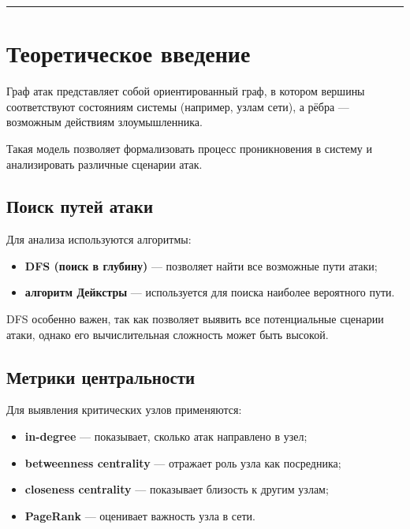 \documentclass[
  english,
  russian,
  12pt,
  a4paper,
  DIV=11,
  numbers=noendperiod]{scrreprt}
\providecommand{\tightlist}{%
  \setlength{\itemsep}{0pt}\setlength{\parskip}{0pt}}
\begin{document}
\begin{center}\rule{0.5\linewidth}{0.5pt}\end{center}

\chapter{Теоретическое
введение}\label{ux442ux435ux43eux440ux435ux442ux438ux447ux435ux441ux43aux43eux435-ux432ux432ux435ux434ux435ux43dux438ux435}

Граф атак представляет собой ориентированный граф, в котором вершины
соответствуют состояниям системы (например, узлам сети), а рёбра ---
возможным действиям злоумышленника.

Такая модель позволяет формализовать процесс проникновения в систему и
анализировать различные сценарии атак.

\section{Поиск путей
атаки}\label{ux43fux43eux438ux441ux43a-ux43fux443ux442ux435ux439-ux430ux442ux430ux43aux438}

Для анализа используются алгоритмы:

\begin{itemize}
\tightlist
\item
  \textbf{DFS (поиск в глубину)} --- позволяет найти все возможные пути
  атаки;
\item
  \textbf{алгоритм Дейкстры} --- используется для поиска наиболее
  вероятного пути.
\end{itemize}

DFS особенно важен, так как позволяет выявить все потенциальные сценарии
атаки, однако его вычислительная сложность может быть высокой.

\section{Метрики
центральности}\label{ux43cux435ux442ux440ux438ux43aux438-ux446ux435ux43dux442ux440ux430ux43bux44cux43dux43eux441ux442ux438}

Для выявления критических узлов применяются:

\begin{itemize}
\tightlist
\item
  \textbf{in-degree} --- показывает, сколько атак направлено в узел;
\item
  \textbf{betweenness centrality} --- отражает роль узла как посредника;
\item
  \textbf{closeness centrality} --- показывает близость к другим узлам;
\item
  \textbf{PageRank} --- оценивает важность узла в сети.
\end{itemize}
\end{document}
